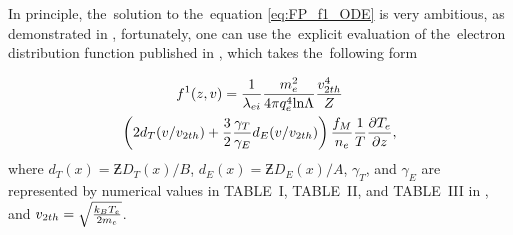 In principle, the~solution to the~equation \eqref{eq:FP_f1_ODE}
is very ambitious, as demonstrated in 
\cite{Chandrasekhar_RMP1943, CSR_1950, Rosenbluth_PR1957}, fortunately, one 
can use the~explicit evaluation of the~electron distribution function
published in \cite{SpitzerHarm_PR1953}, which takes the~following form
 %
\begin{multline}
  f^1(z, v) = \frac{1}{\lambda_{ei}}\frac{m_e^2}{4 \pi q_e^4\text{ln}\Lambda} 
  \frac{v_{2 th}^4}{Z}
  \\
  \left( 2 d_T(v/v_{2 th}) 
  + \frac{3}{2}\frac{\gamma_T}{\gamma_E} d_E(v/v_{2 th}) \right) 
  \frac{f_M}{n_e}\frac{1}{T}\frac{\partial{T_e}}{\partial{z}}  ,
  \label{eq:f1_SH}
\end{multline}
where $d_T(x) = \Zbar D_{T}(x) / B$, $d_E(x) = \Zbar D_{E}(x) / A$, $\gamma_T$,
and $\gamma_E$ are represented by numerical values in TABLE~I, TABLE~II, and
TABLE~III in \cite{SpitzerHarm_PR1953}, and 
$v_{2 th} = \sqrt{\frac{k_B T_e}{2m_e}}$.

